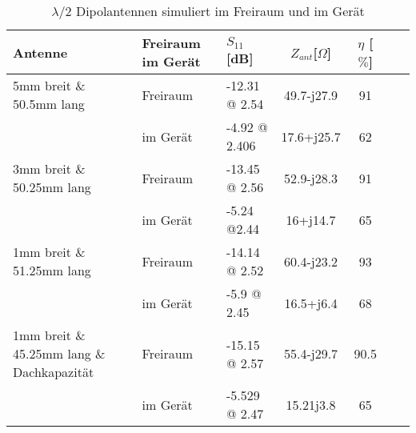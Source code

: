 \begin{table}[!ht]
  \centering
  \begin{tabular}{p{8cm} p{2cm} l c c c r} 
  \toprule 
  Antenne                  	& Freiraum im Gerät	 & $S_{11}$[dB]	& $Z_{ant}$[$\Omega$] 	& $\eta$ [$\%$]\\ 
  \midrule
 5mm breit \& 50.5mm lang    	& Freiraum			&	-12.31 @ 2.54		&  	49.7-j27.9		&   	91	\\
            					& im Gerät   			&   -4.92 @ 2.406   		&	17.6+j25.7		& 	62	\\
 3mm breit \& 50.25mm lang    & Freiraum			&    -13.45 @ 2.56  		&	52.9-j28.3		&	91	\\
     						& im Gerät				&  	-5.24 @2.44			&	16+j14.7			&	65	\\
 1mm breit \& 51.25mm lang  	& Freiraum			&    -14.14 @ 2.52    	&	60.4-j23.2		&	93	\\
      						& im Gerät			&  	-5.9 @ 2.45			&	16.5+j6.4		&	68	\\
  1mm breit \& 45.25mm lang
  \& Dachkapazität  		& Freiraum				&   -15.15 @ 2.57      	&	55.4-j29.7		&	90.5	\\
      						& im Gerät			&  	-5.529 @ 2.47		&	15.21j3.8		&	65	\\
 \bottomrule
  \end{tabular}
  \caption{$\lambda/2$ Dipolantennen simuliert im Freiraum und im Gerät}
  \label{tab:Vergeich_Lambda/2_Freiraum_Geraet}
\end{table}
%	

%	

%	

